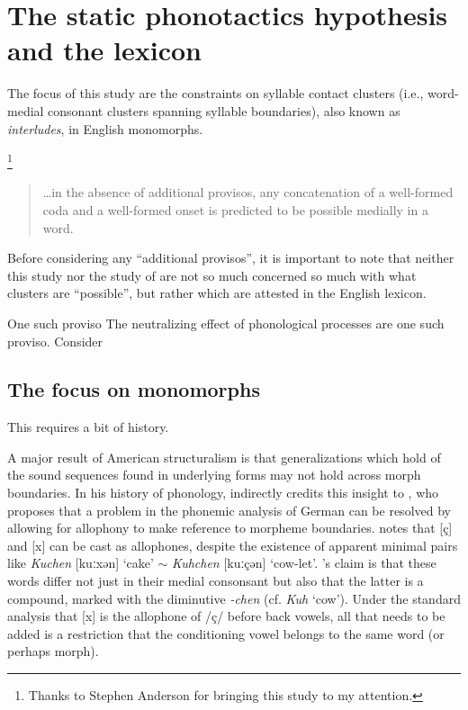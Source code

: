\section{The static phonotactics hypothesis and the lexicon}


The focus of this study are the constraints on syllable contact clusters (i.e., word-medial consonant clusters spanning syllable boundaries), also known as \emph{interludes}, in English monomorphs.

\citep{Haugen1956}
\footnote{Thanks to Stephen Anderson for bringing this study to my attention.}

\begin{quote}
\ldots{}in the absence of additional provisos, any concatenation of a well-formed coda and a well-formed onset is predicted to be possible medially in a word. \citep[][168]{Pierrehumbert1994}
\end{quote}

\noindent Before considering any ``additional provisos'', it is important to note that neither this study nor the study of \citet{Pierrehumbert1994} are not so much concerned so much with what clusters are ``possible'', but rather which are attested in the English lexicon. 

One such proviso 
The neutralizing effect of phonological processes are one such proviso. Consider 

\subsection{The focus on monomorphs}

This requires a bit of history. 

A major result of American structuralism is that generalizations which hold of the sound sequences found in underlying forms may not hold across morph boundaries. In his history of phonology, \citet[][267]{Anderson1985} indirectly credits this insight to \citet{Bloomfield1930}, who proposes that a problem in the phonemic analysis of German can be resolved by allowing for allophony to make reference to morpheme boundaries. \citeauthor{Bloomfield1930} notes that [ç] and [x] can be cast as allophones, despite the existence of apparent minimal pairs like \emph{Kuchen} [kuːxən] `cake' $\sim$ \emph{Kuhchen} [kuːçən] `cow-let'. \citeauthor{Bloomfield1930}'s claim is that these words differ not just in their medial consonsant but also that the latter is a compound, marked with the diminutive \emph{-chen} (cf. \emph{Kuh} `cow'). Under the standard analysis that [x] is the allophone of /ç/ before back vowels, 
all that needs to be added is a restriction that the conditioning vowel belongs to the same word (or perhaps morph). 

